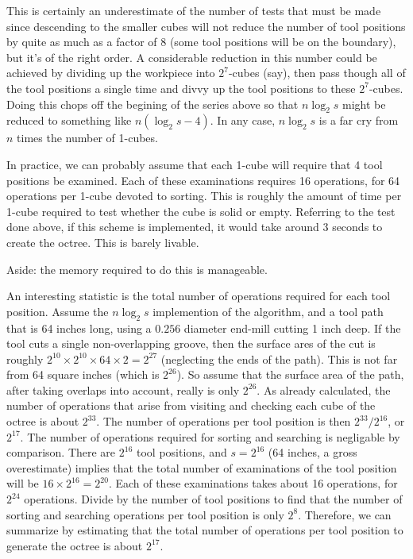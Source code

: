 \documentclass[titlepage,oneside,10pt]{article}
\begin{document}
This is certainly an underestimate of the number of tests that must be
made since descending to the smaller cubes will not reduce the number
of tool positions by quite as much as a factor of 8 (some tool
positions will be on the boundary), but it's of the right order. A
considerable reduction in this number could be achieved by dividing up
the workpiece into $2^7$-cubes (say), then pass though all of the tool
positions a single time and divvy up the tool positions to these
$2^7$-cubes. Doing this chops off the begining of the series above so
that $n\log_2 s$ might be reduced to something like $n(\log_2 s -
4)$. In any case, $n\log_2 s$ is a far cry from $n$ times the number
of 1-cubes. 

In practice, we can probably assume that each 1-cube will
require that 4 tool positions be examined. Each of these examinations
requires 16 operations, for 64 operations per 1-cube devoted to
sorting. This is roughly the amount of time per 1-cube required to
test whether the cube is solid or empty. Referring to the test done
above, if this scheme is implemented, it would take around 3 seconds
to create the octree. This is barely livable.

Aside: the memory required to do this is manageable. 

An interesting statistic is the total number of operations required for each
tool position. Assume the $n\log_2 s$ implemention of the algorithm,
and a tool path that is 64 inches long, using a $0.256$ diameter
end-mill cutting 1 inch deep. If the tool cuts a single
non-overlapping groove, then the surface ares of the cut is roughly
$2^{10}\times 2^{10}\times 64\times 2 = 2^{27}$ (neglecting the ends
of the path). This is not far from 64 square inches (which is
$2^{26}$). So assume that the surface area of the path, after taking
overlaps into account, really is only $2^{26}$. As already calculated,
the number of operations that arise from visiting and checking each
cube of the octree is about $2^{33}$. The number of operations per
tool position is then $2^{33}/2^{16}$, or $2^{17}$. The number of
operations required for sorting and searching is negligable by
comparison. There are $2^{16}$ tool positions, and $s=2^{16}$ (64
inches, a gross overestimate) implies that the total number of examinations of
the tool position will be $16\times 2^{16} = 2^{20}$. Each of these
examinations takes about 16 operations, for $2^{24}$
operations. Divide by the number of tool positions to find that the
number of sorting and searching operations per tool position is only
$2^8$. Therefore, we can summarize by estimating that the total number
of operations per tool position to generate the octree is about
$2^{17}$.
\end{document}
